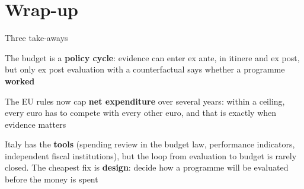\documentclass[aspectratio=169,xcolor=table]{beamer}
\begin{document}
\section{Wrap-up}

\begin{frame}{Three take-aways}
\be
  \item The budget is a \textbf{policy cycle}: evidence can enter ex ante, in itinere and ex post, but only ex post evaluation with a counterfactual says whether a programme \textbf{worked}
  \item The EU rules now cap \textbf{net expenditure} over several years: within a ceiling, every euro has to compete with every other euro, and that is exactly when evidence matters
  \item Italy has the \textbf{tools} (spending review in the budget law, performance indicators, independent fiscal institutions), but the loop from evaluation to budget is rarely closed. The cheapest fix is \textbf{design}: decide how a programme will be evaluated before the money is spent
\ee
{}
\end{frame}
\end{document}
